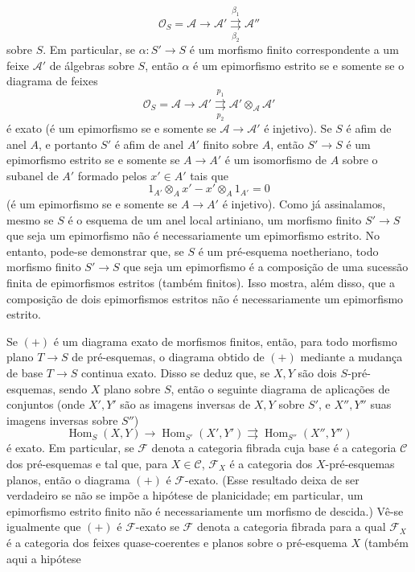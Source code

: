 \[
  \mathcal O_S=\mathcal A\longrightarrow\mathcal A'
  \overset{\beta_1}{\underset{\beta_2}{\rightrightarrows}}\mathcal A''
\]
sobre $S$. Em particular, se $\alpha:S'\longrightarrow S$ é um morfismo
finito correspondente a um feixe $\mathcal A'$ de álgebras sobre $S$, então
$\alpha$ é um epimorfismo estrito se e somente se o diagrama de feixes
\[
  \mathcal O_S=\mathcal A\longrightarrow\mathcal A'
  \overset{p_1}{\underset{p_2}{\rightrightarrows}}
  \mathcal A'\otimes_{\mathcal A}\mathcal A'
\]
é exato (é um epimorfismo se e somente se
$\mathcal A\longrightarrow\mathcal A'$ é injetivo). Se $S$ é afim de anel
$A$, e portanto $S'$ é afim de anel $A'$ finito sobre $A$, então
$S'\longrightarrow S$ é um epimorfismo estrito se e somente se
$A\longrightarrow A'$ é um isomorfismo de $A$ sobre o subanel de $A'$
formado pelos $x'\in A'$ tais que
\[
  1_{A'}\otimes_Ax'-x'\otimes_A1_{A'}=0
\]
(é um epimorfismo se e somente se $A\longrightarrow A'$ é injetivo). Como já
assinalamos, mesmo se $S$ é o esquema de um anel local artiniano, um
morfismo finito $S'\longrightarrow S$ que seja um epimorfismo não é
necessariamente um epimorfismo estrito. No entanto, pode-se demonstrar que, se
$S$ é um pré-esquema noetheriano, todo morfismo finito
$S'\longrightarrow S$ que seja um epimorfismo é a composição de uma sucessão
finita de epimorfismos estritos (também finitos). Isso mostra, além disso, que
a composição de dois epimorfismos estritos não é necessariamente um
epimorfismo estrito.

 Se $(+)$ é um diagrama exato de morfismos finitos, então,
para todo morfismo plano $T\longrightarrow S$ de pré-esquemas, o diagrama
obtido de $(+)$ mediante a mudança de base $T\longrightarrow S$ continua
exato. Disso se deduz que, se $X,Y$ são dois $S$-pré-esquemas, sendo $X$
plano sobre $S$, então o seguinte diagrama de aplicações de conjuntos
(onde $X',Y'$ são as imagens inversas de $X,Y$ sobre $S'$, e $X'',Y''$ suas
imagens inversas sobre $S''$)
\[
  \operatorname{Hom}_S(X,Y)\longrightarrow
  \operatorname{Hom}_{S'}(X',Y')
  \rightrightarrows
  \operatorname{Hom}_{S''}(X'',Y'')
\]
é exato. Em particular, se $\mathcal F$ denota a categoria fibrada cuja base
é a categoria $\mathcal C$ dos pré-esquemas e tal que, para
$X\in\mathcal C$, $\mathcal F_X$ é a categoria dos $X$-pré-esquemas
planos, então o diagrama $(+)$ é $\mathcal F$-exato. (Esse resultado deixa
de ser verdadeiro se não se impõe a hipótese de planicidade; em particular, um
epimorfismo estrito finito não é necessariamente um morfismo de descida.)
Vê-se igualmente que $(+)$ é $\mathcal F$-exato se $\mathcal F$ denota a
categoria fibrada para a qual $\mathcal F_X$ é a categoria dos feixes
quase-coerentes e planos sobre o pré-esquema $X$ (também aqui a hipótese

